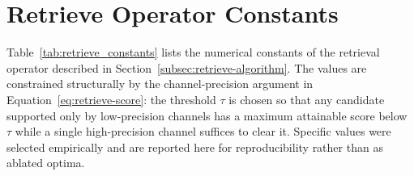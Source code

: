 
\section{Retrieve Operator Constants}
\label{app:retrieve-constants}

Table~\ref{tab:retrieve_constants} lists the numerical constants of
the retrieval operator described in
Section~\ref{subsec:retrieve-algorithm}. The values are constrained
structurally by the channel-precision argument in
Equation~\eqref{eq:retrieve-score}: the threshold $\tau$ is chosen
so that any candidate supported only by low-precision channels has
a maximum attainable score below $\tau$ while a single
high-precision channel suffices to clear it. Specific values were
selected empirically and are reported here for reproducibility
rather than as ablated optima.

